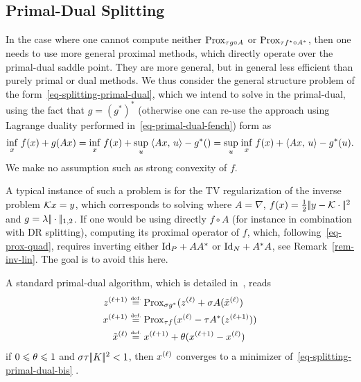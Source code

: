 \subsection{Primal-Dual Splitting}

In the case where one cannot compute neither $\Prox_{\tau g \circ A}$ or $\Prox_{\tau f^\star\circ A^*}$, then one needs to use more general proximal methods, which directly operate over the primal-dual saddle point. They are more general, but in general less efficient than purely primal or dual methods. 
%
We thus consider the general structure problem of the form~\eqref{eq-splitting-primal-dual}, which we intend to solve in the primal-dual, using the fact that $g = (g^*)^*$ (otherwise one can re-use the approach using Lagrange duality performed in~\eqref{eq-primal-dual-fench}) form as
\begin{align}\label{eq-splitting-primal-dual-bis}
	\uinf{x} f(x) + g(Ax) = \uinf{x} f(x) + \usup{u} \dotp{Ax}{u} - g^*()
	= \usup{u} \uinf{x} f(x) + \dotp{Ax}{u}  - g^*(u).
\end{align}
We make no assumption such as strong convexity of $f$. 

\begin{exmp}
A typical instance of such a problem is for the TV regularization of the inverse problem $\Kk x=y$, which corresponds to solving
where $A=\nabla$, $f(x)=\frac{1}{2}\norm{y-\Kk \cdot}^2$ and $g=\la \norm{\cdot}_{1,2}$.
%
If one would be using directly $f \circ A$ (for instance in combination with DR splitting), computing its proximal operator of $f$, which, following~\eqref{eq-prox-quad}, requires inverting either $\Id_P+AA^*$ or $\Id_N+A^*A$, see Remark~\ref{rem-inv-lin}. The goal is to avoid this here. 
\end{exmp}

A standard primal-dual algorithm, which is detailed in~\cite{}, reads
\begin{align*}
	\iit{z} &\eqdef \Prox_{\sigma g^*}( \it{z} + \sigma A( \it{\tilde x}) \\
	\iit{x} &\eqdef \Prox_{\tau f}(  \it{x}-\tau A^*(\iit{z}) ) \\
	 \it{\tilde x} &\eqdef \iit{x} + \theta (\iit{x} - \it{x}) 
\end{align*}
if $0 \leq \th \leq 1$ and $\sigma \tau \norm{K}^2<1$, then $\it{x}$ converges to a minimizer of~\eqref{eq-splitting-primal-dual-bis} .
